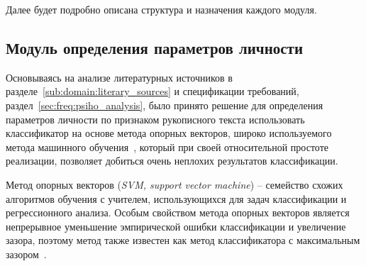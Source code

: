 Далее будет подробно описана структура и назначения каждого модуля.


\subsection{Модуль определения параметров личности}

Основываясь на анализе литературных источников в разделе~\ref{sub:domain:literary_sources} и спецификации требований, раздел~\ref{sec:freq:psiho_analysis}, было принято решение для определения параметров личности по признаком рукописного текста использовать классификатор на основе метода опорных векторов, широко используемого метода машинного обучения~\cite{manning_ir}, который при своей относительной простоте реализации, позволяет добиться очень неплохих результатов классификации.

Метод опорных векторов (\emph{SVM, support vector machine}) – семейство схожих алгоритмов обучения с учителем, использующихся для задач классификации и регрессионного анализа. Особым свойством метода опорных векторов является непрерывное уменьшение эмпирической ошибки классификации и увеличение зазора, поэтому метод также известен как метод классификатора с максимальным зазором~\cite{mitchell_ml, wiki_SVM}.

